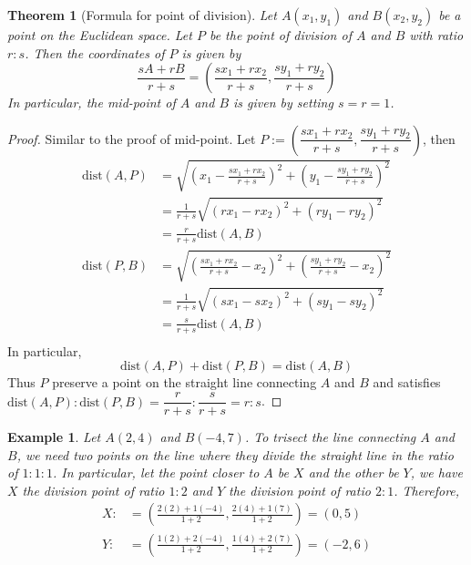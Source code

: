 \documentclass[12pt]{article}
\newtheorem*{theorem}{Theorem}
\newtheorem*{example}{Example}
\begin{document}
    \begin{theorem}[Formula for point of division]
        Let $A(x_1,y_1)$ and $B(x_2,y_2)$ be a point on the Euclidean space. Let $P$ be the point of division of $A$ and $B$ with ratio $r:s$. Then the coordinates of $P$ is given by $$\frac{sA+rB}{r+s}=(\frac{sx_1+rx_2}{r+s},\frac{sy_1+ry_2}{r+s})$$ In particular, the mid-point of $A$ and $B$ is given by setting $s=r=1$.
    \end{theorem}

    \begin{proof}
        Similar to the proof of mid-point. Let $P:=(\dfrac{sx_1+rx_2}{r+s},\dfrac{sy_1+ry_2}{r+s})$, then\begin{align*}
            \mathrm{dist}(A,P)&=\sqrt{(x_1-\frac{sx_1+rx_2}{r+s})^2+(y_1-\frac{sy_1+ry_2}{r+s})^2}\\
            &=\frac{1}{r+s}\sqrt{(rx_1-rx_2)^2+(ry_1-ry_2)^2}\\
            &=\frac{r}{r+s}\mathrm{dist}(A,B)\\
            \mathrm{dist}(P,B)&=\sqrt{(\frac{sx_1+rx_2}{r+s}-x_2)^2+(\frac{sy_1+ry_2}{r+s}-x_2)^2}\\
            &=\frac{1}{r+s}\sqrt{(sx_1-sx_2)^2+(sy_1-sy_2)^2}\\
            &=\frac{s}{r+s}\mathrm{dist}(A,B)\\
        \end{align*}
        In particular, $$\mathrm{dist}(A,P)+\mathrm{dist}(P,B)=\mathrm{dist}(A,B)$$
        Thus $P$ preserve a point on the straight line connecting $A$ and $B$ and satisfies $\mathrm{dist}(A,P):\mathrm{dist}(P,B)=\dfrac{r}{r+s}:\dfrac{s}{r+s}=r:s$.
    \end{proof}

    \begin{example}
        Let $A(2,4)$ and $B(-4,7)$. To trisect the line connecting $A$ and $B$, we need two points on the line where they divide the straight line in the ratio of $1:1:1$. In particular, let the point closer to $A$ be $X$ and the other be $Y$, we have $X$ the division point of ratio $1:2$ and $Y$ the division point of ratio $2:1$. Therefore,\begin{align*}
            X:&=(\frac{2(2)+1(-4)}{1+2}, \frac{2(4)+1(7)}{1+2})=(0,5)\\
            Y:&=(\frac{1(2)+2(-4)}{1+2}, \frac{1(4)+2(7)}{1+2})=(-2,6)\\
        \end{align*}
    \end{example}
\end{document}
